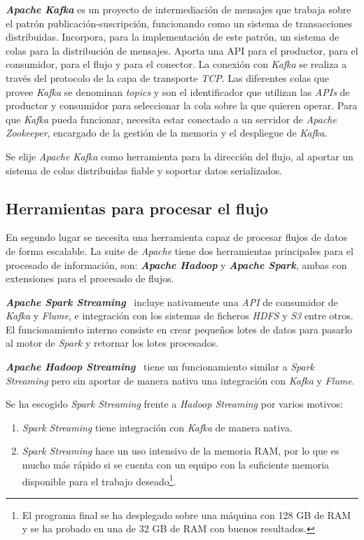 \textit{\textbf{Apache Kafka}} es un proyecto de intermediación de mensajes que trabaja sobre el patrón publicación-suscripción, funcionando como un sistema de transacciones distribuidas. Incorpora, para la implementación de este patrón, un sistema de colas para la distribución de mensajes. Aporta una API para el productor, para el consumidor, para el flujo y para el conector. La conexión con \textit{Kafka} se realiza a través del protocolo de la capa de transporte \textit{TCP}. Las diferentes colas que provee \textit{Kafka} se denominan \textit{topics} y son el identificador que utilizan las \textit{APIs} de productor y consumidor para seleccionar la cola sobre la que quieren operar. Para que \textit{Kafka} pueda funcionar, necesita estar conectado a un servidor de \textit{Apache Zookeeper}, encargado de la gestión de la memoria y el despliegue de \textit{Kafka}.

Se elije \textit{Apache Kafka} como herramienta para la dirección del flujo, al aportar un sistema de colas distribuidas fiable y soportar datos serializados.

\subsection{Herramientas para procesar el flujo}
En segundo lugar se necesita una herramienta capaz de procesar flujos de datos de forma escalable. La suite de \textit{Apache} tiene dos herramientas principales para el procesado de información, son: \textit{\textbf{Apache Hadoop}} y \textit{\textbf{Apache Spark}}, ambas con extensiones para el procesado de flujos.

\textit{\textbf{Apache Spark Streaming}}~\cite{noauthorsparknodate} incluye nativamente una \textit{API} de consumidor de \textit{Kafka} y \textit{Flume}, e integración con los sistemas de ficheros \textit{HDFS} y \textit{S3} entre otros. El funcionamiento interno consiste en crear pequeños lotes de datos para pasarlo al motor de \textit{Spark} y retornar los lotes procesados.

\textit{\textbf{Apache Hadoop Streaming}}~\cite{noauthorhadoop} tiene un funcionamiento similar a \textit{Spark Streaming} pero sin aportar de manera nativa una integración con \textit{Kafka} y \textit{Flume}.

Se ha escogido \textit{Spark Streaming} frente a \textit{Hadoop Streaming} por varios motivos:
\begin{enumerate}
	\item \textit{Spark Streaming} tiene integración con \textit{Kafka} de manera nativa.
	\item \textit{Spark Streaming} hace un uso intensivo de la memoria RAM, por lo que es mucho más rápido si se cuenta con un equipo con la suficiente memoria disponible para el trabajo deseado\footnote{El programa final se ha desplegado sobre una máquina con 128 GB de RAM y se ha probado en una de 32 GB de RAM con buenos resultados.}.
\end{enumerate}



